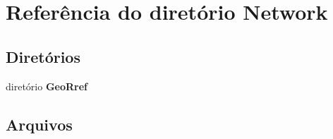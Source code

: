 \section{Referência do diretório Network}
\label{dir_1553e7a2de22f123df73839d1e033b6d}
\subsection*{Diretórios}
\begin{DoxyCompactItemize}
\item 
diretório {\bf Geo\+Rref}
\end{DoxyCompactItemize}
\subsection*{Arquivos}
